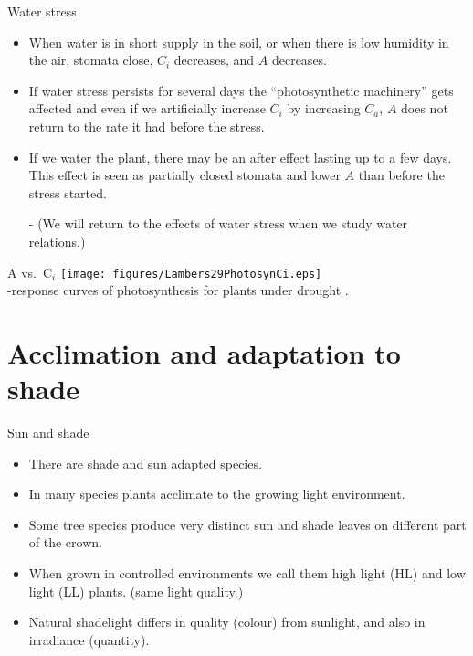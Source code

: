 \documentclass[10pt]{beamer}
\begin{document}
\begin{frame}{Water stress}
    \begin{itemize}
        \item When water is in short supply in the soil, or when there is low
        humidity in the air, stomata close, $C_i$ decreases, and $A$ decreases.
        \item If water stress persists for several days the
        ``photosynthetic machinery'' gets affected and even if we
        artificially increase $C_i$ by increasing $C_a$, $A$ does
        not return to the rate it had before the stress.
        \item If we water the plant, there may be an after effect
        lasting up to a few days. This effect is seen as partially
        closed stomata and lower $A$ than before the stress started.
        \item[-] (We will return to the effects of water stress when we
        study water relations.)
    \end{itemize}
\end{frame}

\begin{frame}{A vs.\ C$_i$}
    \centering
    \texttt{[image: figures/Lambers29PhotosynCi.eps]}\\
    {\footnotesize \COtwo-response curves of photosynthesis for plants under drought
    \autocite[from][]{LambersEtAl1998}.}
\end{frame}

\section{Acclimation and adaptation to shade}

\begin{frame}{Sun and shade}
    \begin{itemize}
        \item There are shade and sun adapted species.
        \item In many species plants acclimate to the growing light
        environment.
        \item Some tree species produce very distinct sun and shade
        leaves on different part of the crown.
        \item When grown in controlled environments we call them
        high light (HL) and low light (LL) plants. (same light quality.)
        \item Natural shadelight differs in quality (colour) from
        sunlight, and also in irradiance (quantity).
    \end{itemize}
\end{frame}
\end{document}
